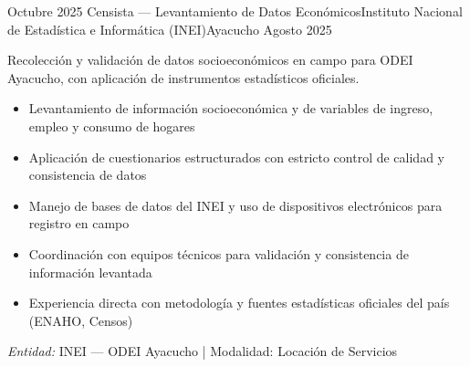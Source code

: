 \experience
{Octubre 2025} {Censista — Levantamiento de Datos Económicos}{Instituto Nacional de Estadística e Informática (INEI)}{Ayacucho}
{Agosto 2025} {
	Recolección y validación de datos socioeconómicos en campo para ODEI Ayacucho, con aplicación de instrumentos estadísticos oficiales.
	\begin{itemize}
		\item Levantamiento de información socioeconómica y de variables de ingreso, empleo y consumo de hogares
		\item Aplicación de cuestionarios estructurados con estricto control de calidad y consistencia de datos
		\item Manejo de bases de datos del INEI y uso de dispositivos electrónicos para registro en campo
		\item Coordinación con equipos técnicos para validación y consistencia de información levantada
		\item Experiencia directa con metodología y fuentes estadísticas oficiales del país (ENAHO, Censos)
	\end{itemize}
}
{\footnotesize{\emph{Entidad:} INEI — ODEI Ayacucho | Modalidad: Locación de Servicios}}
